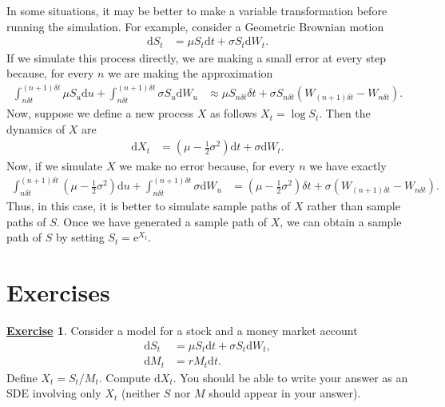 \documentclass[12pt]{book}
\numberwithin{equation}{chapter}
\theoremstyle{plain}
\numberwithin{theorem}{section}
\theoremstyle{definition}
\newtheorem{exercise}{\underline{Exercise}}
\numberwithin{exercise}{chapter}
\newcommand{\<}{\langle}
\renewcommand{\>}{\rangle}
\renewcommand{\(}{\left(}
\renewcommand{\)}{\right)}
\renewcommand{\[}{\left[}
\renewcommand{\]}{\right]}
\newcommand\sig{\sigma}
\newcommand\del{\delta}
\newcommand\dd{\mathrm{d}}
\newcommand\ee{\mathrm{e}}
\theoremstyle{definition}
\numberwithin{question}{section}
\begin{document}
\noindent
In some situations, it may be better to make a variable transformation before running the simulation.  For example, consider a Geometric Brownian motion
\begin{align}
\dd S_t 
	&= \mu S_t \dd t + \sigma S_t \dd W_t .
\end{align}
If we simulate this process directly, we are making a small error at every step because, for every $n$ we are making the approximation
\begin{align}
\int_{n \del t}^{(n+1) \del t} \mu S_u \dd u + \int_{n \del t}^{(n+1) \del t} \sigma S_u \dd W_u
	&\approx \mu S_{n \del t} \del t +  \sigma S_{n \del t} (W_{(n+1)\del t} - W_{n \del t}) .
\end{align}
Now, suppose we define a new process $X$ as follows $X_t = \log S_t$.  Then the dynamics of $X$ are
\begin{align}
\dd X_t 
	&= (\mu - \frac{1}{2} \sigma^2) \dd t + \sigma \dd W_t.
\end{align}
Now, if we simulate $X$ we make no error because, for every $n$ we have exactly
\begin{align}
\int_{n \del t}^{(n+1) \del t} (\mu - \tfrac{1}{2} \sig^2) \dd u + \int_{n \del t}^{(n+1) \del t} \sigma \dd W_u
	&= (\mu - \tfrac{1}{2} \sig^2) \del t + \sigma (W_{(n+1)\del t} - W_{n \del t}) .
\end{align}
Thus, in this case, it is better to simulate sample paths of $X$ rather than sample paths of $S$.   Once we have generated a sample path of $X$, we can obtain a sample path of $S$ by setting $S_t = \ee^{X_t}$.


\section{Exercises}
\label{sec:exer-4}

\begin{exercise}
\label{exer:4-1}
Consider a model for a stock and a money market account
\begin{align}
\dd S_t
	&=	\mu S_t \dd t + \sig S_t \dd W_t , \\
\dd M_t
	&=	r M_t \dd t .
\end{align}
Define $X_t = S_t/M_t$.  Compute $\dd X_t$.  You should be able to write your answer as an SDE involving only $X_t$ (neither $S$ nor $M$ should appear in your answer).
\end{exercise}
\end{document}
